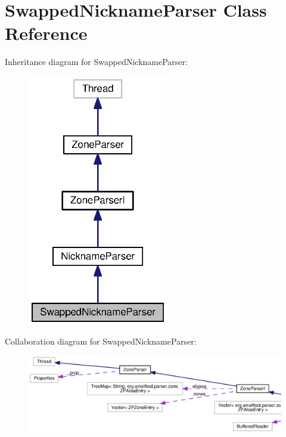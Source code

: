 \section{Swapped\+Nickname\+Parser Class Reference}
\label{classorg_1_1smallfoot_1_1parser_1_1zone_1_1SwappedNicknameParser}


Inheritance diagram for Swapped\+Nickname\+Parser\+:\nopagebreak
\begin{figure}[H]
\begin{center}
\leavevmode
\includegraphics[width=174pt]{classorg_1_1smallfoot_1_1parser_1_1zone_1_1SwappedNicknameParser__inherit__graph}
\end{center}
\end{figure}


Collaboration diagram for Swapped\+Nickname\+Parser\+:\nopagebreak
\begin{figure}[H]
\begin{center}
\leavevmode
\includegraphics[width=350pt]{classorg_1_1smallfoot_1_1parser_1_1zone_1_1SwappedNicknameParser__coll__graph}
\end{center}
\end{figure}
